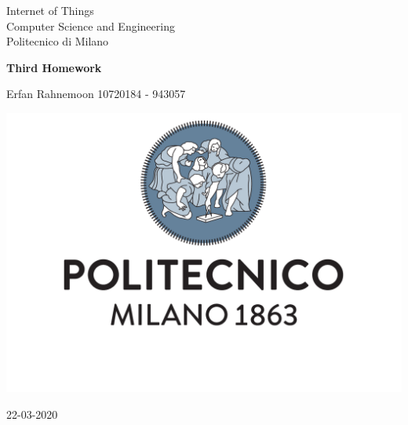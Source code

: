 \documentclass[10pt,english, openany]{book}
\begin{document}

\begin{titlepage}
	\clearpage\thispagestyle{empty}
	\centering
	\vspace{1cm}

	{\normalsize Internet of Things \\ 
		Computer Science and Engineering \\
		Politecnico di Milano \par}
		\vspace{3cm}
	{\Huge \textbf{Third Homework}} \\
	\vspace{4cm}
	{\normalsize Erfan Rahnemoon 10720184 - 943057 \par}
	\vspace{5cm}
    
    \centering \includegraphics[scale=0.4]{logo1.pdf}
    
    \vspace{0.5cm}
		
	{\normalsize 22-03-2020 \par}
	

\end{titlepage}

\end{document}
